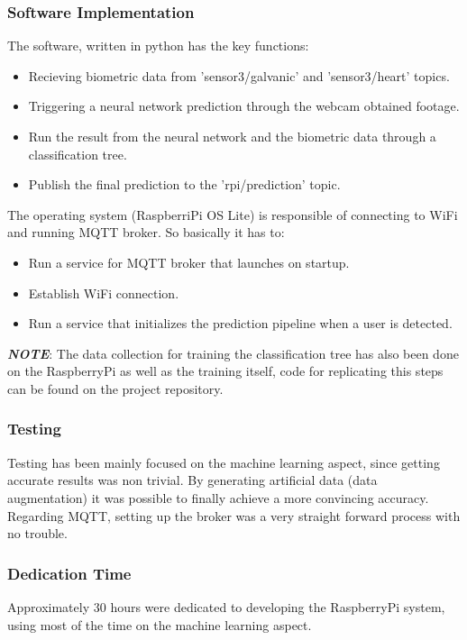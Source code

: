 \documentclass{article}
\begin{document}
\subsubsection{Software Implementation}
The software, written in python has the key functions:
\begin{itemize}
    \item Recieving biometric data from 'sensor3/galvanic' and 'sensor3/heart' topics.
    \item Triggering a neural network prediction through the webcam obtained footage.
    \item Run the result from the neural network and the biometric data through a classification tree.
    \item Publish the final prediction to the 'rpi/prediction' topic.
\end{itemize}
The operating system (RaspberriPi OS Lite) is responsible of connecting to WiFi and running MQTT broker. So basically it has to:
\begin{itemize}
    \item Run a service for MQTT broker that launches on startup.
    \item Establish WiFi connection.
    \item Run a service that initializes the prediction pipeline when a user is detected.
\end{itemize}

\textbf{\textit{NOTE}}: The data collection for training the classification tree has also been done on the RaspberryPi as well as the training itself, code for replicating this steps can be found on the project repository.

\subsubsection{Testing}
Testing has been mainly focused on the machine learning aspect, since getting accurate results was non trivial. By generating artificial data (data augmentation) it was possible to finally achieve a more convincing accuracy. Regarding MQTT, setting up the broker was a very straight forward process with no trouble.

\subsubsection{Dedication Time}
Approximately 30 hours were dedicated to developing the RaspberryPi system, using most of the time on the machine learning aspect.
\end{document}

